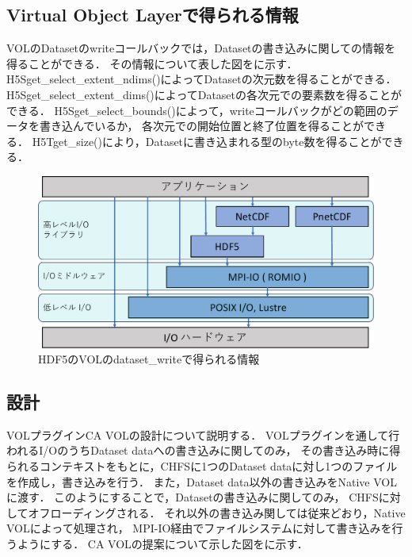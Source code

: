 \documentclass[submit,techrep,noauthor]{ipsj}
\begin{document}
\subsection{Virtual Object Layerで得られる情報}
VOLのDatasetのwriteコールバックでは，Datasetの書き込みに関しての情報を得ることができる．
その情報について表した図をに示す．
H5Sget\_select\_extent\_ndims()によってDatasetの次元数を得ることができる．
H5Sget\_select\_extent\_dims()によってDatasetの各次元での要素数を得ることができる．
H5Sget\_select\_bounds()によって，writeコールバックがどの範囲のデータを書き込んでいるか，
各次元での開始位置と終了位置を得ることができる．
H5Tget\_size()により，Datasetに書き込まれる型のbyte数を得ることができる．

\begin{figure}[t]
	\centering
	\includegraphics[page=16,width=\linewidth]{figure-crop.pdf}
	\caption{HDF5のVOLのdataset\_writeで得られる情報}
	\label{fig:hdf5infoinvol}
\end{figure}


\subsection{設計}
VOLプラグインCA VOLの設計について説明する．
VOLプラグインを通して行われるI/OのうちDataset dataへの書き込みに関してのみ，
その書き込み時に得られるコンテキストをもとに，CHFSに1つのDataset dataに対し1つのファイルを作成し，書き込みを行う．
また，Dataset data以外の書き込みをNative VOLに渡す．
このようにすることで，Datasetの書き込みに関してのみ，
CHFSに対してオフローディングされる．
それ以外の書き込み関しては従来どおり，Native VOLによって処理され，
MPI-IO経由でファイルシステムに対して書き込みを行うようにする．
CA VOLの提案について示した図をに示す．
\end{document}
